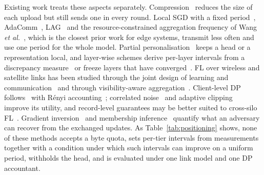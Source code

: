 \documentclass[journal]{IEEEtran}
\begin{document}
Existing work treats these aspects separately. Compression~\cite{alistarh2017qsgd,sattler2020} reduces the size of each upload but still sends one in every round. Local SGD with a fixed period~\cite{stich2019,wang2021coop,lin2020postlocal}, AdaComm~\cite{wang2019adacomm}, LAG~\cite{chen2018lag} and the resource-constrained aggregation frequency of Wang \emph{et al.}~\cite{wang2019jsac}, which is the closest prior work for edge systems, transmit less often and use one period for the whole model. Partial personalisation~\cite{arivazhagan2019,collins2021,pillutla2022} keeps a head or a representation local, and layer-wise schemes derive per-layer intervals from a discrepancy measure~\cite{lee2023fedlama} or freeze layers that have converged~\cite{malan2024alf}. FL over wireless and satellite links has been studied through the joint design of learning and communication~\cite{chen2021joint} and through visibility-aware aggregation~\cite{razmi2022leo}. Client-level DP follows~\cite{mcmahan2018dp} with R\'enyi accounting~\cite{mironov2017,mironov2019sgm}; correlated noise~\cite{kairouz2021ftrl,choquette2024correlated} and adaptive clipping~\cite{andrew2021adaptive} improve its utility, and record-level guarantees may be better suited to cross-silo FL~\cite{liu2022crosssilo,liu2024recordlevel}. Gradient inversion~\cite{zhu2019dlg,geiping2020} and membership inference~\cite{yeom2018,carlini2022lira} quantify what an adversary can recover from the exchanged updates. As Table~\ref{tab:positioning} shows, none of these methods accepts a byte quota, sets per-tier intervals from measurements together with a condition under which such intervals can improve on a uniform period, withholds the head, and is evaluated under one link model and one DP accountant.
\end{document}
